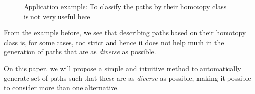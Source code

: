 \documentclass[graybox]{svmult}
\begin{document}
\begin{figure}[]
		\centering
          \caption{Application example: To classify the paths by their homotopy class is not very useful here}
          \label{fig:IntroductionNoHomo3D}
\end{figure}


From the example before, we see that describing paths based on their homotopy class is, for some cases, too strict and hence it does not help much in the generation of paths that are as \emph{diverse} as possible.

On this paper, we will propose a simple and intuitive method to automatically generate set of paths such that these are as \emph{diverse} as possible, making it possible to consider more than one alternative. 


\end{document}
